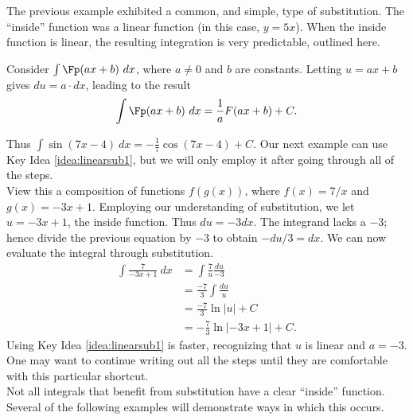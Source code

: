 The previous example exhibited a common, and simple, type of substitution. The ``inside'' function was a linear function (in this case, $y = 5x$). When the inside function is linear, the resulting integration is very predictable, outlined here.

{Consider $\int \Fp(ax+b)\ dx$, where $a\neq 0$ and $b$ are constants. Letting $u = ax+b$ gives $du = a\cdot dx$, leading to the result
$$\int \Fp(ax+b)\ dx = \frac{1}{a}F(ax+b) + C.$$
}

Thus $\int \sin (7x-4)\ dx = -\frac17\cos(7x-4)+C$. Our next example can use Key Idea \ref{idea:linearsub1}, but we will only employ it after going through all of the steps.\\

{View this a composition of functions $f(g(x))$, where $f(x) = 7/x$ and $g(x) = -3x+1$. Employing our understanding of substitution, we let $u = -3x+1$, the inside function. Thus $du = -3dx$. The integrand lacks a $-3$; hence divide the previous equation by $-3$ to obtain $-du/3 = dx$. We can now evaluate the integral through substitution.
\begin{align*}
	\int \frac{7}{-3x+1}\ dx &=	\int \frac{7}{u}\frac{du}{-3} \\
												&= \frac{-7}3\int \frac{du}{u} \\
												&=	\frac{-7}3\ln |u| + C\\
												&=-\frac73\ln|-3x+1| + C.
\end{align*}
Using Key Idea \ref{idea:linearsub1} is faster, recognizing that $u$ is linear and $a = -3$. One may want to continue writing out all the steps until they are comfortable with this particular shortcut.
}\\

Not all integrals that benefit from substitution have a clear ``inside'' function. Several of the following examples will demonstrate ways in which this occurs.\\

